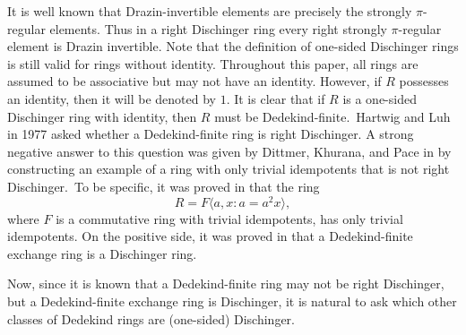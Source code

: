 \documentclass[12pt]{article}
\theoremstyle{plain}
\theoremstyle{definition}
\begin{document}
It is well known that Drazin-invertible elements are precisely the strongly $\pi$-regular elements. Thus in a right Dischinger ring every right strongly $\pi$-regular element is Drazin invertible. Note that the definition of one-sided Dischinger rings is still valid for rings without identity. Throughout this paper, all rings are assumed to be associative but may not have an identity. However, if $R$ possesses an identity, then it will be denoted by $1$.
	It is clear that if $R$ is a one-sided Dischinger ring with identity, then $R$ must be Dedekind-finite.\ Hartwig and Luh \cite[Page 94]{HartLuh} in 1977 asked whether a Dedekind-finite ring is right Dischinger. A strong negative answer to this question was given by Dittmer, Khurana, and Pace in \cite[Theorem 2.3]{Dit} by constructing an example of a ring with only trivial idempotents that is not right Dischinger.\ To be specific, it was proved in  \cite[Theorem 2.3]{Dit}  that the ring 
	\begin{equation}
		R = F\langle a,x :  a= a^2x\rangle, \tag{1.3}
	\end{equation}  
	where $F$ is a commutative ring with trivial idempotents, has only trivial idempotents. On the positive side, it was proved in \cite[Corollary 3.5]{Dit} that a Dedekind-finite exchange ring is a Dischinger ring.\\
	\par Now, since it is known that a Dedekind-finite ring may not be right Dischinger, but a Dedekind-finite exchange ring is Dischinger, it is natural to ask which other classes of Dedekind rings are (one-sided) Dischinger.\\
\end{document}
